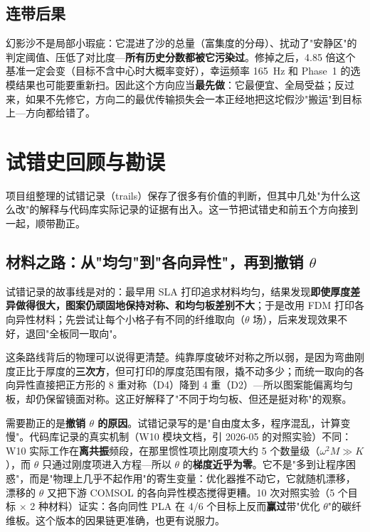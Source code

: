 \documentclass[11pt,a4paper]{article}
\begin{document}
\subsection{连带后果}

幻影沙不是局部小瑕疵：它混进了沙的总量（富集度的分母）、扰动了"安静区"的判定阈值、压低了对比度---\textbf{所有历史分数都被它污染过}。修掉之后，4.85 倍这个基准一定会变（目标不含中心时大概率变好），幸运频率 165~Hz 和 Phase~1 的选模结果也可能要重新扫。因此这个方向应当\textbf{最先做}：它最便宜、全局受益；反过来，如果不先修它，方向二的最优传输损失会一本正经地把这坨假沙"搬运"到目标上---方向都给错了。

\section{试错史回顾与勘误}

项目组整理的试错记录（trails）保存了很多有价值的判断，但其中几处"为什么这么改"的解释与代码库实际记录的证据有出入。这一节把试错史和前五个方向接到一起，顺带勘正。

\subsection{材料之路：从"均匀"到"各向异性"，再到撤销 $\theta$}

试错记录的故事线是对的：最早用 SLA 打印追求材料均匀，结果发现\textbf{即使厚度差异做得很大，图案仍顽固地保持对称、和均匀板差别不大}；于是改用 FDM 打印各向异性材料；先尝试让每个小格子有不同的纤维取向（$\theta$ 场），后来发现效果不好，退回"全板同一取向"。

这条路线背后的物理可以说得更清楚。纯靠厚度破坏对称之所以弱，是因为弯曲刚度正比于厚度的\textbf{三次方}，但可打印的厚度范围有限，撬不动多少；而统一取向的各向异性直接把正方形的 8 重对称（D4）降到 4 重（D2）---所以图案能偏离均匀板，却仍保留镜面对称。这正好解释了"不同于均匀板、但还是挺对称"的观察。

需要勘正的是\textbf{撤销 $\theta$ 的原因}。试错记录写的是"自由度太多，程序混乱，计算变慢"。代码库记录的真实机制（W10 模块文档，引 2026-05 的对照实验）不同：W10 实际工作在\textbf{离共振}频段，在那里惯性项比刚度项大约 5 个数量级（$\omega^2 M \gg K$），而 $\theta$ 只通过刚度项进入方程---所以 $\theta$ 的\textbf{梯度近乎为零}。它不是"多到让程序困惑"，而是"物理上几乎不起作用"的寄生变量：优化器推不动它，它就随机漂移，漂移的 $\theta$ 又把下游 COMSOL 的各向异性模态搅得更糟。10 次对照实验（5 个目标 $\times$ 2 种材料）证实：各向同性 PLA 在 4/6 个目标上反而\textbf{赢过}带"优化 $\theta$"的碳纤维板。这个版本的因果链更准确，也更有说服力。
\end{document}
